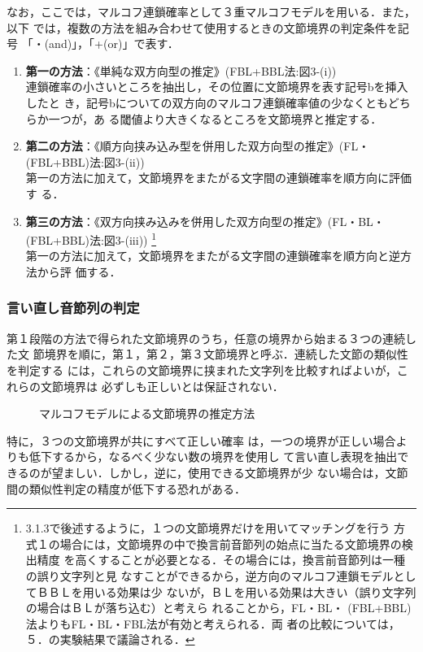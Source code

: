 なお，ここでは，マルコフ連鎖確率として３重マルコフモデルを用いる．また，以下
では，複数の方法を組み合わせて使用するときの文節境界の判定条件を記号
「・(and)」，「+(or)」で表す．
\Vspace
\begin{enumerate}
\item {\bf 第一の方法}：《単純な双方向型の推定》(FBL+BBL法:図3-(i))\\
連鎖確率の小さいところを抽出し，その位置に文節境界を表す記号bを挿入したと
き，記号bについての双方向のマルコフ連鎖確率値の少なくともどちらか一つが，あ
る閾値より大きくなるところを文節境界と推定する．
\item {\bf 第二の方法}：《順方向挟み込み型を併用した双方向型の推定》(FL・
(FBL+BBL)法:図3-(ii))\\
第一の方法に加えて，文節境界をまたがる文字間の連鎖確率を順方向に評価す
る．
\item {\bf 第三の方法}：《双方向挟み込みを併用した双方向型の推定》(FL・BL・
(FBL+BBL)法:図3-(iii))
\footnote{3.1.3で後述するように，１つの文節境界だけを用いてマッチングを行う
方式１の場合には，文節境界の中で換言前音節列の始点に当たる文節境界の検出精度
を高くすることが必要となる．その場合には，換言前音節列は一種の誤り文字列と見
なすことができるから，逆方向のマルコフ連鎖モデルとしてＢＢＬを用いる効果は少
ないが，ＢＬを用いる効果は大きい（誤り文字列の場合はＢＬが落ち込む）と考えら
れることから，FL・BL・ (FBL+BBL)法よりもFL・BL・FBL法が有効と考えられる．両
者の比較については，５．の実験結果で議論される．}\\
第一の方法に加えて，文節境界をまたがる文字間の連鎖確率を順方向と逆方法から評
価する．
\end{enumerate}
\Vspace
\subsubsection{言い直し音節列の判定}

第１段階の方法で得られた文節境界のうち，任意の境界から始まる３つの連続した文
節境界を順に，第１，第２，第３文節境界と呼ぶ．連続した文節の類似性を判定する
には，これらの文節境界に挟まれた文字列を比較すればよいが，これらの文節境界は
必ずしも正しいとは保証されない．
\begin{figure}[tbp]
  \begin{center}
    \medskip
    \caption{マルコフモデルによる文節境界の推定方法}
    \label{fig:3}
  \end{center}
\end{figure}
特に，３つの文節境界が共にすべて正しい確率
は，一つの境界が正しい場合よりも低下するから，なるべく少ない数の境界を使用し
て言い直し表現を抽出できるのが望ましい．しかし，逆に，使用できる文節境界が少
ない場合は，文節間の類似性判定の精度が低下する恐れがある．

